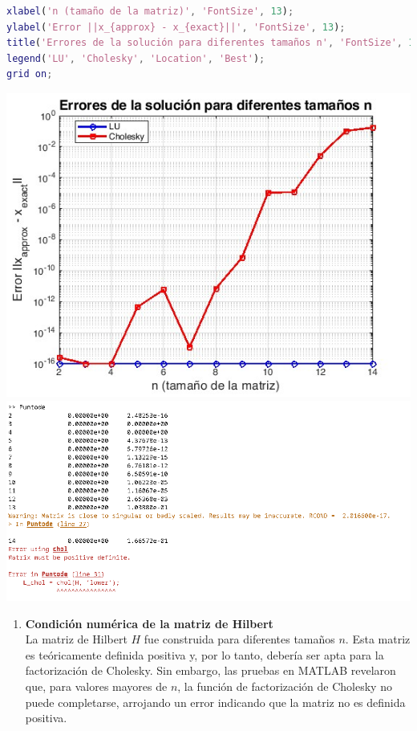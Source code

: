 \begin{homeworkProblem}
\begin{solucion}
\begin{enumerate}[a)]
\begin{lstlisting}[language=matlab]
% Etiquetas y título
xlabel('n (tamaño de la matriz)', 'FontSize', 13);
ylabel('Error ||x_{approx} - x_{exact}||', 'FontSize', 13);
title('Errores de la solución para diferentes tamaños n', 'FontSize', 14);
legend('LU', 'Cholesky', 'Location', 'Best');
grid on;
          \end{lstlisting}
          \begin{center}
            \includegraphics[scale=0.5]{grafico_matlab.jpg}\\
            \includegraphics[scale=0.6]{codematlab_4.png}
          \end{center}
          \begin{enumerate}[1)]
            \item \textbf{ Condición numérica de la matriz de Hilbert}\\
              La matriz de Hilbert \( H \) fue construida para diferentes tamaños \( n \). Esta matriz es teóricamente definida positiva y, por lo tanto, debería ser apta para la factorización de Cholesky. Sin embargo, las pruebas en MATLAB revelaron que, para valores mayores de \( n \), la función de factorización de Cholesky no puede completarse, arrojando un error indicando que la matriz no es definida positiva.

\end{enumerate}
\end{enumerate}
\end{solucion}
\end{homeworkProblem}
